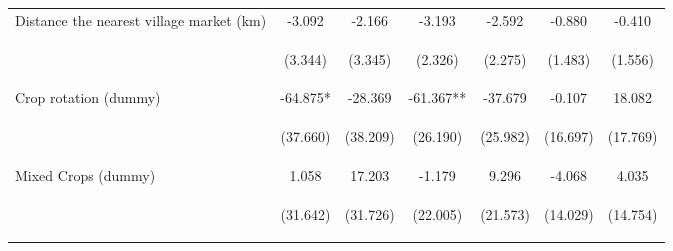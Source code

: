 \begin{center}
\begin{tabular}{lcccccc}
Distance the nearest village market (km) & -3.092 & -2.166 & -3.193 & -2.592 & -0.880 & -0.410 \\
\vspace{4pt} & \begin{footnotesize}(3.344)\end{footnotesize} & \begin{footnotesize}(3.345)\end{footnotesize} & \begin{footnotesize}(2.326)\end{footnotesize} & \begin{footnotesize}(2.275)\end{footnotesize} & \begin{footnotesize}(1.483)\end{footnotesize} & \begin{footnotesize}(1.556)\end{footnotesize} \\
Crop rotation (dummy) & -64.875* & -28.369 & -61.367** & -37.679 & -0.107 & 18.082 \\
\vspace{4pt} & \begin{footnotesize}(37.660)\end{footnotesize} & \begin{footnotesize}(38.209)\end{footnotesize} & \begin{footnotesize}(26.190)\end{footnotesize} & \begin{footnotesize}(25.982)\end{footnotesize} & \begin{footnotesize}(16.697)\end{footnotesize} & \begin{footnotesize}(17.769)\end{footnotesize} \\
Mixed Crops (dummy) & 1.058 & 17.203 & -1.179 & 9.296 & -4.068 & 4.035 \\
\vspace{4pt} & \begin{footnotesize}(31.642)\end{footnotesize} & \begin{footnotesize}(31.726)\end{footnotesize} & \begin{footnotesize}(22.005)\end{footnotesize} & \begin{footnotesize}(21.573)\end{footnotesize} & \begin{footnotesize}(14.029)\end{footnotesize} & \begin{footnotesize}(14.754)\end{footnotesize} \\

\end{tabular}
\end{center}
